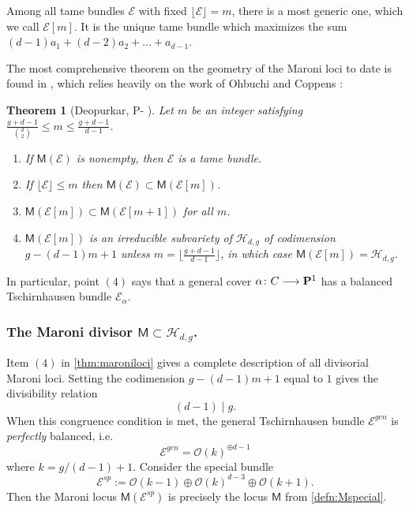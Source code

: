 \documentclass[reqno, 10 pt]{article}
\newtheorem{thm}{Theorem}
\theoremstyle{definition}
\theoremstyle{remark}
\numberwithin{equation}{section}
\numberwithin{thm}{section}
\numberwithin{prop}{section}
\numberwithin{lem}{section}
\numberwithin{cor}{section}
\numberwithin{conj}{section}
\numberwithin{defn}{section}
\renewcommand{\H}{\mathcal H}
\renewcommand{\to}{\longrightarrow}
\newcommand{\sfM}{{\mathsf M}}
\newcommand{\cE}{{\mathcal E}}
\newcommand{\cO}{{\mathcal O}}
\renewcommand{\P}{{\bf P}}
\newcommand {\from}{{\colon}}
\renewcommand{\H}{{\mathcal{H}}}
\begin{document}
Among all tame bundles $\cE$ with fixed $\lfloor \cE \rfloor = m$, there is a most generic one, which we call $\cE[m]$.  It is the unique tame bundle which maximizes the sum $(d-1)a_{1} + (d-2)a_{2} + ... + a_{d-1}$. 

The most comprehensive theorem on the geometry of the Maroni loci to date is found in \cite{dp:pic_345}, which relies heavily on the work of Ohbuchi \cite{ohbuchi:relations} and Coppens \cite{coppens_existence}:

\begin{thm}[Deopurkar, P- \cite{dp:pic_345}]\label{thm:maroniloci}
  Let $m$ be an integer satisfying $\frac{g+d-1}{{d \choose 2}} \leq m \leq  \frac{g+d-1}{d-1} $.
  \begin{enumerate}
  \item If $\sfM(\cE)$ is nonempty, then $\cE$ is a tame bundle.
  \item If $\lfloor \cE \rfloor \leq m$ then $\sfM(\cE) \subset \sfM(\cE[m])$.
  \item $\sfM(\cE[m]) \subset \sfM(\cE[m+1])$ for all $m$.   
  \item $\sfM(\cE[m])$ is an irreducible subvariety of $\H_{d,g}$ of codimension $g-(d-1)m + 1$ unless $m = \lfloor \frac{g+d-1}{d-1} \rfloor$, in which case $\sfM(\cE[m]) =  \H_{d,g}$.
  \end{enumerate}
\end{thm}


In particular, point $(4)$ says that a general cover $\alpha \from C \to \P^1$ has a balanced Tschirnhausen bundle $\cE_{\alpha}$. 

\subsubsection{The Maroni divisor $\sfM \subset \H_{d,g}$.}  Item $(4)$ in \autoref{thm:maroniloci} gives a complete description of all divisorial Maroni loci.   Setting the codimension $g-(d-1)m +1$ equal to $1$ gives the divisibility relation 
\begin{equation}\label{cong:maroni}
(d-1) \mid g. 
\end{equation}
When this congruence condition is met, the general Tschirnhausen bundle $\cE^{gen}$ is {\sl perfectly} balanced, i.e. 
\[\cE^{gen} = \cO(k)^{\oplus d-1}\] where $k = g/(d-1) +1$.
Consider the special bundle 
\[\cE^{sp} := \cO(k-1) \oplus \cO(k)^{d-3} \oplus \cO(k+1).\] Then the Maroni locus $\sfM(\cE^{sp})$ is precisely the locus $\sfM$ from \autoref{defn:Mspecial}.
\end{document}

